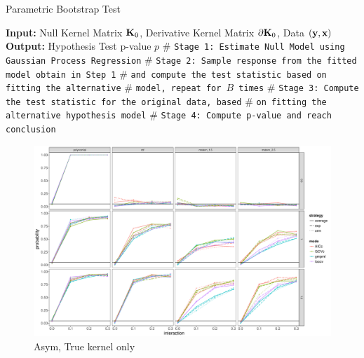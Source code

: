 \documentclass[article]{jss}
\begin{document}
\begin{algorithm}
\caption{Parametric Bootstrap Test} 
\label{alg:cvek}
\begin{algorithmic}[1]
\newline
\textbf{Input:} Null Kernel Matrix ${\bf K}_0$, Derivative Kernel Matrix $\partial {\bf K}_0$, Data $({\bf y}, {\bf x})$\newline
\textbf{Output:} Hypothesis Test p-value $p$\newline
$\#$ \texttt{Stage 1: Estimate Null Model using Gaussian Process Regression}
\newline
$\#$ \texttt{Stage 2: Sample response from the fitted model obtain in Step 1}
\newline
$\#$ \texttt{and compute the test statistic based on fitting the alternative}
\newline
$\#$ \texttt{model, repeat for $B$ times}
\EndFor 
\newline
$\#$ \texttt{Stage 3: Compute the test statistic for the original data, based}
\newline
$\#$ \texttt{on fitting the alternative hypothesis model}
\newline
$\#$ \texttt{Stage 4: Compute p-value and reach conclusion}
\EndProcedure
\end{algorithmic}
\end{algorithm}

\clearpage

\begin{figure}
\begin{center}
\includegraphics[width=0.9\columnwidth]{A1} 
\caption{Asym, True kernel only}
\label{fig:res}
\end{center}
\end{figure}
\end{document}
